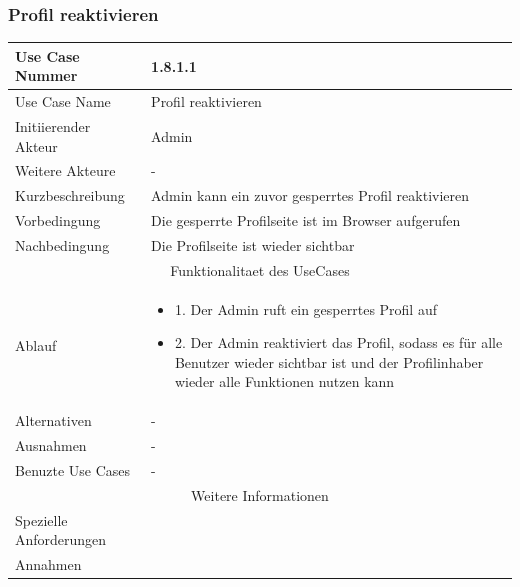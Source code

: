 \documentclass[10pt,a4paper]{article}
\begin{document}
			\subsubsection{Profil reaktivieren}
		\begin{tabular}{|l|p{.5\linewidth}|}
		\hline Use Case Nummer & 1.8.1.1 \\ 
		\hline Use Case Name & Profil reaktivieren \\ 
		\hline Initiierender Akteur & Admin \\
		\hline Weitere Akteure & - \\
		\hline Kurzbeschreibung & Admin kann ein zuvor gesperrtes Profil reaktivieren \\
		\hline Vorbedingung & Die gesperrte Profilseite ist im Browser aufgerufen \\
		\hline Nachbedingung & Die Profilseite ist wieder sichtbar \\
		\hline \multicolumn{2}{|c|}{Funktionalitaet des UseCases}\\
		\hline Ablauf & \begin{itemize}
					\item 1. Der Admin ruft ein gesperrtes Profil auf
					\item 2. Der Admin reaktiviert das Profil, sodass es f\"ur alle Benutzer wieder sichtbar ist und der Profilinhaber wieder alle Funktionen nutzen kann
				\end{itemize}\\
		\hline Alternativen & - \\
		\hline Ausnahmen & - \\
		\hline Benuzte Use Cases & - \\
		\hline \multicolumn{2}{|c|}{Weitere Informationen} \\
		\hline Spezielle Anforderungen &  \\
		\hline Annahmen &  \\
		\hline
		\end{tabular}
		
\end{document}
